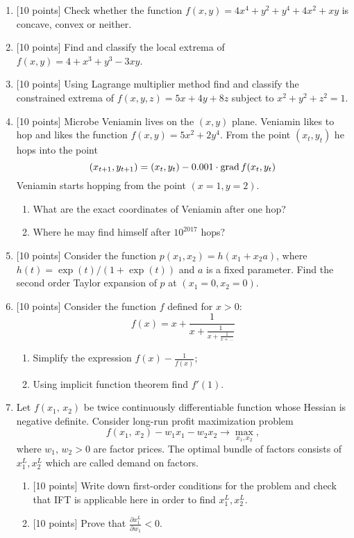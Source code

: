 \begin{enumerate}
\item {[10 points]} Check whether the function $f(x,y)= 4x^4 + y^2+y^4+4x^2+xy$ is concave, convex or neither.
\item {[10 points]} Find and classify the local extrema of $f(x,y) = 4 + x^3 + y^3 - 3xy$.
\item {[10 points]} Using Lagrange multiplier method find and classify the constrained extrema of $f(x, y, z) =  5x +4y + 8z$ subject to $x^2 + y^2 + z^2 = 1$.
\item {[10 points]} Microbe Veniamin lives on the $(x, y)$ plane. Veniamin likes to hop and likes the function $f(x, y) = 5x^2 + 2y^4$. From the point $(x_t, y_t)$ he hops into the point
\[
(x_{t+1},y_{t+1})=(x_t, y_t) - 0.001\cdot \mathrm{grad}\, f(x_t, y_t)
\]
Veniamin starts hopping from the point $(x=1, y =2)$.

\begin{enumerate}
  \item What are the exact coordinates of Veniamin after one hop?
  \item Where he may find himself after $10^{2017}$ hops?
\end{enumerate}
\item {[10 points]} Consider the function $p(x_1, x_2) = h(x_1 + x_2 a)$, where $h(t) = \exp(t)/(1+\exp(t))$ and $a$ is a fixed parameter. Find the second order Taylor expansion of $p$ at $(x_1=0, x_2=0)$.

\item {[10 points]} Consider the function $f$ defined for $x>0$:
\[
f(x) = x + \frac{1}{x + \frac{1}{x + \frac{1}{x + \ldots}}}
\]
\begin{enumerate}
  \item Simplify the expression $f(x) - \frac{1}{f(x)}$;
  \item Using implicit function theorem find $f'(1)$.
\end{enumerate}

\item Let $f({x_1},\,{x_2})$ be twice continuously differentiable function whose Hessian is negative definite. Consider long-run profit maximization problem
\[
f({x_1},\,{x_2}) - {w_1}{x_1} - {w_2}{x_2} \to \max_{x_1, x_2},
\]
where ${w_1},\,{w_2} > 0$ are factor prices. The optimal bundle of factors consists of $x_1^L, x_2^L$ which are called demand on factors.
\begin{enumerate}
\item {[10 points]} Write down first-order conditions for the problem and check that IFT is applicable here in order to find $x_1^L, x_2^L$.
\item {[10 points]} Prove that $\frac{{\partial x_1^L}}{{\partial {w_1}}} < 0$.
\end{enumerate}


\end{enumerate}
